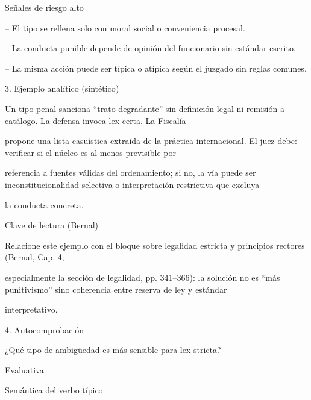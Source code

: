 \documentclass[11pt,a4paper]{article}
\begin{document}
          Señales de riesgo alto\par


-- El tipo se rellena solo con moral social o conveniencia procesal.\par


-- La conducta punible depende de opinión del funcionario sin estándar escrito.\par


-- La misma acción puede ser típica o atípica según el juzgado sin reglas comunes.\par









      3. Ejemplo analítico (sintético)\par


        Un tipo penal sanciona “trato degradante” sin definición legal ni remisión a catálogo. La defensa invoca lex certa. La Fiscalía\par
        propone una lista casuística extraída de la práctica internacional. El juez debe: verificar si el núcleo es al menos previsible por\par
        referencia a fuentes válidas del ordenamiento; si no, la vía puede ser inconstitucionalidad selectiva o interpretación restrictiva que excluya\par
        la conducta concreta.\par



        Clave de lectura (Bernal)\par

          Relacione este ejemplo con el bloque sobre legalidad estricta y principios rectores (Bernal, Cap. 4,\par
          especialmente la sección de legalidad, pp. 341–366): la solución no es “más punitivismo” sino coherencia entre reserva de ley y estándar\par
          interpretativo.\par






      4. Autocomprobación\par

      ¿Qué tipo de ambigüedad es más sensible para lex stricta?\par

      Evaluativa\par
      Semántica del verbo típico\par
\end{document}
